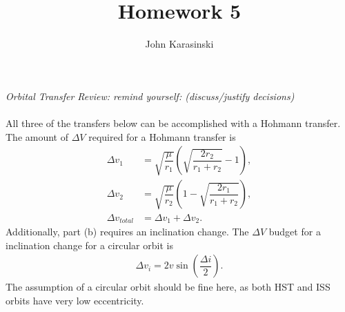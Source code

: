 \documentclass[onecolumn,10pt]{jhwhw}
\author{John Karasinski}
\title{Homework 5}
\begin{document}

\problem{}
\textit{Orbital Transfer Review: remind yourself: (discuss/justify decisions)} \\
\\
All three of the transfers below can be accomplished with a Hohmann transfer. The amount of $\Delta V$ required for a Hohmann transfer is
\begin{align*}
\Delta v_1 &= \sqrt{\dfrac{\mu}{r_1}} \left(\sqrt{\dfrac{2r_2}{r_1 + r_2}} -1 \right), \\
\Delta v_2 &= \sqrt{\dfrac{\mu}{r_2}} \left(1 - \sqrt{\dfrac{2r_1}{r_1 + r_2}} \right), \\
\Delta v_{total} &= \Delta v_1 + \Delta v_2.
\end{align*}
Additionally, part (b) requires an inclination change. The $\Delta V$ budget for a inclination change for a circular orbit is
\begin{align*}
\Delta{v_i}= 2 v \sin \left( \dfrac{\Delta i}{2} \right).
\end{align*}
The assumption of a circular orbit should be fine here, as both HST and ISS orbits have very low eccentricity.
\end{document}
